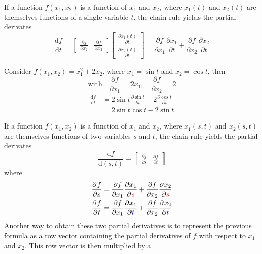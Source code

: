\documentclass{article}
\begin{document}
If a function $f(x_1,x_2)$ is a function of $x_1$ and $x_2$, where
$x_1(t)$ and $x_2(t)$ are themselves functions of a single variable $t$, the
chain rule yields the partial derivates
$$\frac{\text{d}f}{\text{d}t}=\begin{bmatrix}
    \frac{\partial{f}}{\partial{x_1}} & \frac{\partial{f}}{\partial{x_2}}
    \end{bmatrix}\begin{bmatrix}
    \frac{\partial{x_1(t)}}{\partial{t}} \\ 
    \frac{\partial{x_2(t)}}{\partial{t}}
\end{bmatrix}=\frac{\partial{f}}{\partial{x_1}}\frac{\partial{x_1}}{\partial{t}}+\frac{\partial{f}}{\partial{x_2}}\frac{\partial{x_2}}{\partial{t}}$$
\newpage
\begin{example}
    Consider $f(x_1,x_2)=x_1^2+2x_2$, where $x_1=\sin t$ and $x_2=\cos t$,
    then
    $$\text{with}\quad\frac{\partial{f}}{\partial{x_1}}=2x_1,\quad \frac{\partial{f}}{\partial{x_2}}=2$$
    $$\begin{aligned}
        \frac{\text{d}f}{\text{d}t}&=2\sin t \frac{\partial{\sin t}}{\partial{t}}+2 \frac{\partial{\cos
        t}}{\partial t}\\
            &=2\sin t\cos t-2\sin t
    \end{aligned}$$
\end{example}
If a function $f(x_1,x_2)$ is a function of $x_1$ and $x_2$, where $x_1(s,t)$
and $x_2(s,t)$ are themselves functions of two variables $s$ and $t$, the
chain rule yields the partial derivates
$$
\frac{\text{d}f}{\text{d}(s,t)}=\begin{bmatrix}
    \frac{\partial{f}}{\partial{s}} & \frac{\partial{f}}{\partial{t}}
\end{bmatrix} 
$$
where 
$$
\begin{aligned}
    \frac{\partial{f}}{\partial{s}}&=\frac{\partial{f}}{\partial{x_1}}\frac{\partial{x_1}}{\partial{{\color{red}s}}}+\frac{\partial{f}}{\partial{x_2}}\frac{\partial{x_2}}{\partial{{\color{red}s}}}\\
    \frac{\partial{f}}{\partial{t}}&=\frac{\partial{f}}{\partial{x_1}}\frac{\partial{x_1}}{\partial{{\color{blue}t}}}+\frac{\partial{f}}{\partial{x_2}}\frac{\partial{x_2}}{\partial{{\color{blue}t}}}\\
\end{aligned}
$$
Another way to obtain these two partial derivatives is to represent the
previous formula as a row vector containing the partial derivatives of $f$
with respect to $x_1$ and $x_2$. This row vector is then multiplied by a
\end{document}
